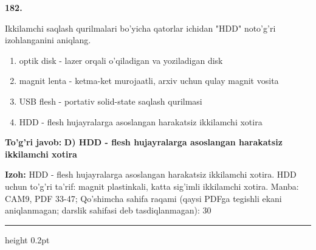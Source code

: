 \documentclass[10pt,a4paper]{article}
\begin{document}
{\bfseries\sffamily\color{ink} 182.}
\par
Ikkilamchi saqlash qurilmalari bo'yicha qatorlar ichidan "HDD" noto'g'ri izohlanganini aniqlang.
\begin{enumerate}[label=\Alph*),leftmargin=9mm]
\item optik disk - lazer orqali o'qiladigan va yoziladigan disk
\item magnit lenta - ketma-ket murojaatli, arxiv uchun qulay magnit vosita
\item USB flesh - portativ solid-state saqlash qurilmasi
\item HDD - flesh hujayralarga asoslangan harakatsiz ikkilamchi xotira
\end{enumerate}
\begin{tcolorbox}[enhanced,breakable,colback=teal!4,colframe=teal!60!black,boxrule=0.45pt,arc=1.2mm,left=2.7mm,right=2.7mm,top=1.8mm,bottom=1.8mm,before skip=2mm,after skip=2mm]
{\bfseries\sffamily\color{teal}To'g'ri javob:} \textbf{D) HDD - flesh hujayralarga asoslangan harakatsiz ikkilamchi xotira}
\par\smallskip
{\bfseries Izoh:} HDD - flesh hujayralarga asoslangan harakatsiz ikkilamchi xotira. HDD uchun to'g'ri ta'rif: magnit plastinkali, katta sig'imli ikkilamchi xotira. Manba: CAM9, PDF 33-47; Qo'shimcha sahifa raqami (qaysi PDFga tegishli ekani aniqlanmagan; darslik sahifasi deb tasdiqlanmagan): 30
\end{tcolorbox}
\vspace{2mm}\hrule height 0.2pt\vspace{3mm}
\end{document}
